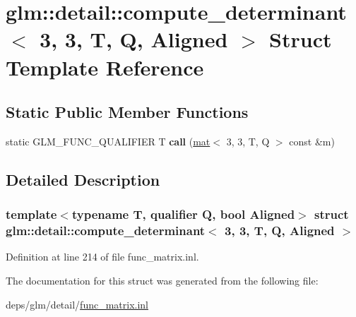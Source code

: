 \hypertarget{structglm_1_1detail_1_1compute__determinant_3_013_00_013_00_01T_00_01Q_00_01Aligned_01_4}{}\section{glm\+:\+:detail\+:\+:compute\+\_\+determinant$<$ 3, 3, T, Q, Aligned $>$ Struct Template Reference}
\label{structglm_1_1detail_1_1compute__determinant_3_013_00_013_00_01T_00_01Q_00_01Aligned_01_4}
\subsection*{Static Public Member Functions}
\begin{DoxyCompactItemize}
\item 
\mbox{\label{structglm_1_1detail_1_1compute__determinant_3_013_00_013_00_01T_00_01Q_00_01Aligned_01_4_a768a144449ee7bbf69cdefe9896f1ceb}} 
static G\+L\+M\+\_\+\+F\+U\+N\+C\+\_\+\+Q\+U\+A\+L\+I\+F\+I\+ER T {\bfseries call} (\hyperlink{structglm_1_1mat}{mat}$<$ 3, 3, T, Q $>$ const \&m)
\end{DoxyCompactItemize}


\subsection{Detailed Description}
\subsubsection*{template$<$typename T, qualifier Q, bool Aligned$>$\newline
struct glm\+::detail\+::compute\+\_\+determinant$<$ 3, 3, T, Q, Aligned $>$}



Definition at line 214 of file func\+\_\+matrix.\+inl.



The documentation for this struct was generated from the following file\+:\begin{DoxyCompactItemize}
\item 
deps/glm/detail/\hyperlink{func__matrix_8inl}{func\+\_\+matrix.\+inl}\end{DoxyCompactItemize}
